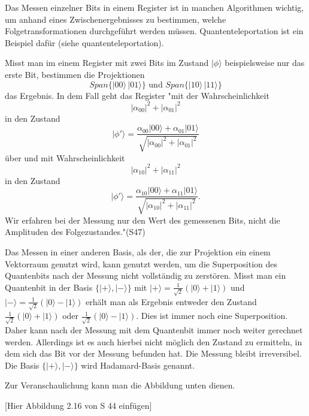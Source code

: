Das Messen einzelner Bits in einem Register ist in manchen Algorithmen wichtig, um anhand eines Zwischenergebnisses zu bestimmen, welche Folgetransformationen durchgeführt werden müssen. Quantenteleportation ist ein Beispiel dafür (siehe quantenteleportation). 

Misst man im einem Register mit zwei Bits im Zustand $\left|\phi\right.\rangle$ beispielsweise nur das erste Bit, bestimmen die Projektionen 
$$Span\{\left|00\right.\rangle\,\left|01\right.\rangle\} \text{ und }Span\{\left|10\right.\rangle\,\left|11\right.\rangle\}$$ das Ergebnis.
In dem Fall geht das Register "mit der Wahrscheinlichkeit
$$\left|\alpha_{00}\right|^2+\left|\alpha_{01}\right|^2$$
in den Zustand 
$$\left|\phi'\right.\rangle=\frac{\alpha_{00}\left|00\right.\rangle+\alpha_{01}\left|01\right.\rangle}{\sqrt{\left|\alpha_{00}\right|^2+\left|\alpha_{01}\right|^2}}$$
über und mit Wahrscheinlichkeit
$$\left|\alpha_{10}\right|^2+\left|\alpha_{11}\right|^2$$
in den Zustand 
$$\left|\phi'\right.\rangle=\frac{\alpha_{10}\left|00\right.\rangle+\alpha_{11}\left|01\right.\rangle}{\sqrt{\left|\alpha_{10}\right|^2+\left|\alpha_{11}\right|^2}}.$$
Wir erfahren bei der Messung nur den Wert des gemessenen Bits, nicht
die Amplituden des Folgezustandes."(S47)

Das Messen in einer anderen Basis, als der, die zur Projektion ein einem Vektorraum genutzt wird, kann genutzt werden, um die Superposition des Quantenbits nach der Messung nicht vollständig zu zerstören. 
Misst man ein Quantenbit in der Basis $\{\left|+\right.\rangle,\left|-\right.\rangle\}$ mit $\left|+\right.\rangle=\frac{1}{\sqrt{2}}\left(\left|0\right.\rangle+\left|1\right.\rangle\right)$ und $\left|-\right.\rangle=\frac{1}{\sqrt{2}}\left(\left|0\right.\rangle-\left|1\right.\rangle\right)$ erhält man als Ergebnis entweder den Zustand $\frac{1}{\sqrt{2}}\left(\left|0\right.\rangle+\left|1\right.\rangle\right)$ oder $\frac{1}{\sqrt{2}}\left(\left|0\right.\rangle-\left|1\right.\rangle\right)$. Dies ist immer noch eine Superposition. Daher kann nach der Messung mit dem Quantenbit immer noch weiter gerechnet werden. Allerdings ist es auch hierbei nicht möglich den Zustand zu ermitteln, in dem sich das Bit vor der Messung befunden hat. Die Messung bleibt irreversibel. Die Basis $\{\left|+\right.\rangle,\left|-\right.\rangle\}$ wird Hadamard-Basis genannt.

Zur Veranschaulichung kann man die Abbildung unten dienen. 

[Hier Abbildung 2.16 von S 44 einfügen]

